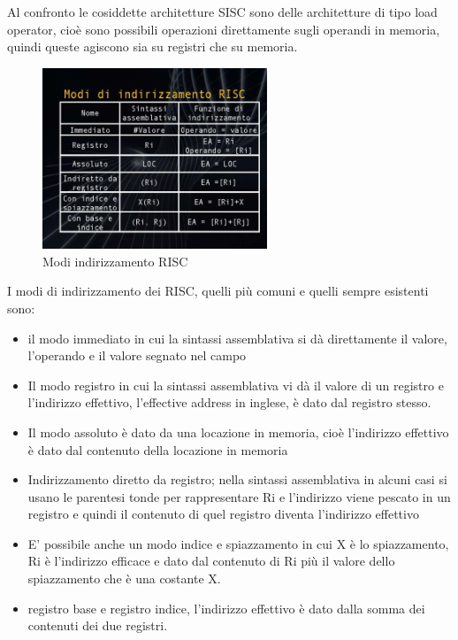 Al confronto le cosiddette architetture SISC sono delle architetture di tipo load operator, cioè sono possibili operazioni direttamente sugli operandi in memoria, quindi queste agiscono sia su registri che su memoria.

\FloatBarrier
\begin{figure}[H]
  \centering
  \includegraphics[width=0.6\textwidth,
                    trim=40 40 45 40, %
                    clip]{images/Lez02_p03_fig_06.png}
  \caption{Modi indirizzamento RISC}
  \label{fig:Lez02_p03_fig_06}
\end{figure}
\FloatBarrier
\noindent

I modi di indirizzamento dei RISC, quelli più comuni e quelli sempre esistenti sono:

\begin{itemize}
  \item il modo immediato in cui la sintassi assemblativa si dà direttamente il valore, l'operando e il valore segnato nel campo
  \item Il modo registro in cui la sintassi assemblativa vi dà il valore di un registro e l'indirizzo effettivo, l'effective address in inglese, è dato dal registro stesso.
  \item Il modo assoluto è dato da una locazione in memoria, cioè l'indirizzo effettivo è dato dal contenuto della locazione in memoria
  \item Indirizzamento diretto da registro; nella sintassi assemblativa in alcuni casi si usano le parentesi tonde per rappresentare Ri e l'indirizzo viene pescato in un registro e quindi il contenuto di quel registro diventa l'indirizzo effettivo
  \item E' possibile anche un modo indice e spiazzamento in cui X è lo spiazzamento, Ri è l'indirizzo efficace e dato dal contenuto di Ri più il valore dello spiazzamento che è una costante X.
  \item registro base e registro indice, l'indirizzo effettivo è dato dalla somma dei contenuti dei due registri.
\end{itemize}


